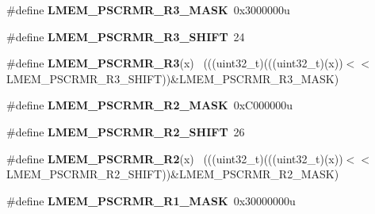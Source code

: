 \begin{DoxyCompactItemize}
\item 
\hypertarget{group___l_m_e_m___register___masks_gaa08715d54012bc6b3a3697e2507592c5}{}\#define {\bfseries L\+M\+E\+M\+\_\+\+P\+S\+C\+R\+M\+R\+\_\+\+R3\+\_\+\+M\+A\+S\+K}~0x3000000u\label{group___l_m_e_m___register___masks_gaa08715d54012bc6b3a3697e2507592c5}

\item 
\hypertarget{group___l_m_e_m___register___masks_ga7c93ed0c12e3537d0474c7e87cbce55b}{}\#define {\bfseries L\+M\+E\+M\+\_\+\+P\+S\+C\+R\+M\+R\+\_\+\+R3\+\_\+\+S\+H\+I\+F\+T}~24\label{group___l_m_e_m___register___masks_ga7c93ed0c12e3537d0474c7e87cbce55b}

\item 
\hypertarget{group___l_m_e_m___register___masks_gaf4f566fcc101b1c337e1a3c23744af2c}{}\#define {\bfseries L\+M\+E\+M\+\_\+\+P\+S\+C\+R\+M\+R\+\_\+\+R3}(x)                                            ~(((uint32\+\_\+t)(((uint32\+\_\+t)(x))$<$$<$L\+M\+E\+M\+\_\+\+P\+S\+C\+R\+M\+R\+\_\+\+R3\+\_\+\+S\+H\+I\+F\+T))\&L\+M\+E\+M\+\_\+\+P\+S\+C\+R\+M\+R\+\_\+\+R3\+\_\+\+M\+A\+S\+K)\label{group___l_m_e_m___register___masks_gaf4f566fcc101b1c337e1a3c23744af2c}

\item 
\hypertarget{group___l_m_e_m___register___masks_gaeeb187a77d0c0a99d655c823d1b6b7c0}{}\#define {\bfseries L\+M\+E\+M\+\_\+\+P\+S\+C\+R\+M\+R\+\_\+\+R2\+\_\+\+M\+A\+S\+K}~0x\+C000000u\label{group___l_m_e_m___register___masks_gaeeb187a77d0c0a99d655c823d1b6b7c0}

\item 
\hypertarget{group___l_m_e_m___register___masks_ga13e90148a9743706f84e40984bb032b9}{}\#define {\bfseries L\+M\+E\+M\+\_\+\+P\+S\+C\+R\+M\+R\+\_\+\+R2\+\_\+\+S\+H\+I\+F\+T}~26\label{group___l_m_e_m___register___masks_ga13e90148a9743706f84e40984bb032b9}

\item 
\hypertarget{group___l_m_e_m___register___masks_gae4ac173dc08ea1e33170540273cae5b0}{}\#define {\bfseries L\+M\+E\+M\+\_\+\+P\+S\+C\+R\+M\+R\+\_\+\+R2}(x)                                            ~(((uint32\+\_\+t)(((uint32\+\_\+t)(x))$<$$<$L\+M\+E\+M\+\_\+\+P\+S\+C\+R\+M\+R\+\_\+\+R2\+\_\+\+S\+H\+I\+F\+T))\&L\+M\+E\+M\+\_\+\+P\+S\+C\+R\+M\+R\+\_\+\+R2\+\_\+\+M\+A\+S\+K)\label{group___l_m_e_m___register___masks_gae4ac173dc08ea1e33170540273cae5b0}

\item 
\hypertarget{group___l_m_e_m___register___masks_ga7246b57413fdfa514e875298f1cf2e68}{}\#define {\bfseries L\+M\+E\+M\+\_\+\+P\+S\+C\+R\+M\+R\+\_\+\+R1\+\_\+\+M\+A\+S\+K}~0x30000000u\label{group___l_m_e_m___register___masks_ga7246b57413fdfa514e875298f1cf2e68}


\end{DoxyCompactItemize}

